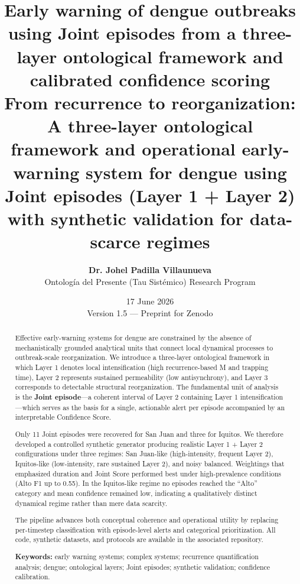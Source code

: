\documentclass[11pt,a4paper]{article}
\title{\textbf{Early warning of dengue outbreaks using Joint episodes from a three-layer ontological framework and calibrated confidence scoring}\\[0.35em]
\large From recurrence to reorganization: A three-layer ontological framework and operational early-warning system for dengue using Joint episodes (Layer 1 + Layer 2) with synthetic validation for data-scarce regimes}
\author{
    \textbf{Dr. Johel Padilla Villaunueva} \\[0.25em]
    \small Ontolog\'ia del Presente (Tau Sist\'emico) Research Program
}
\date{17 June 2026 \\ \small Version 1.5 — Preprint for Zenodo}
\begin{document}
\maketitle

\begin{abstract}
\noindent Effective early-warning systems for dengue are constrained by the absence of mechanistically grounded analytical units that connect local dynamical processes to outbreak-scale reorganization. We introduce a three-layer ontological framework in which Layer 1 denotes local intensification (high recurrence-based M and trapping time), Layer 2 represents sustained permeability (low antisynchrony), and Layer 3 corresponds to detectable structural reorganization. The fundamental unit of analysis is the \textbf{Joint episode}—a coherent interval of Layer 2 containing Layer 1 intensification—which serves as the basis for a single, actionable alert per episode accompanied by an interpretable Confidence Score.

Only 11 Joint episodes were recovered for San Juan and three for Iquitos. We therefore developed a controlled synthetic generator producing realistic Layer 1 + Layer 2 configurations under three regimes: San Juan-like (high-intensity, frequent Layer 2), Iquitos-like (low-intensity, rare sustained Layer 2), and noisy balanced. Weightings that emphasized duration and Joint Score performed best under high-prevalence conditions (Alto F1 up to 0.55). In the Iquitos-like regime no episodes reached the ``Alto'' category and mean confidence remained low, indicating a qualitatively distinct dynamical regime rather than mere data scarcity.

The pipeline advances both conceptual coherence and operational utility by replacing per-timestep classification with episode-level alerts and categorical prioritization. All code, synthetic datasets, and protocols are available in the associated repository.

\vspace{0.2em}
\noindent\textbf{Keywords:} early warning systems; complex systems; recurrence quantification analysis; dengue; ontological layers; Joint episodes; synthetic validation; confidence calibration.
\end{abstract}
\end{document}

